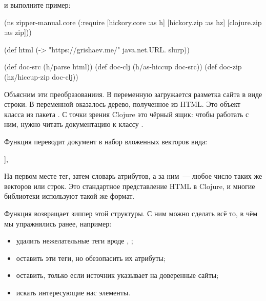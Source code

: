\begin{english}
  \begin{clojure}
[hickory "0.7.1"]
  \end{clojure}
\end{english}

\noindent
и выполните пример:

\begin{english}
  \begin{clojure}
(ns zipper-manual.core
  (:require
   [hickory.core :as h]
   [hickory.zip :as hz]
   [clojure.zip :as zip]))

(def html (-> "https://grishaev.me/"
              java.net.URL.
              slurp))

(def doc-src (h/parse html))
(def doc-clj (h/as-hiccup doc-src))
(def doc-zip (hz/hiccup-zip doc-clj))
  \end{clojure}
\end{english}

Объясним эти преобразованиия. В переменную  загружается разметка сайта в
виде строки. В переменной  оказалось дерево, полученное из HTML. Это
объект класса  из пакета . С точки зрения Clojure это
чёрный ящик: чтобы работать с ним, нужно читать документацию к классу
.

Функция  переводит документ в набор вложенных векторов вида:

\begin{english}
  \begin{clojure}
[:tag {:attr "value"} & [...]],
  \end{clojure}
\end{english}

На первом месте тег, затем словарь атрибутов, а за ним~--- любое число таких же
векторов или строк. Это стандартное представление HTML в Clojure, и многие
библиотеки используют такой же формат.

Функция  возвращает зиппер этой структуры. С ним можно сделать всё
то, в чём мы упражнялись ранее, например:

\begin{itemize}

\item
  удалить нежелательные теги вроде , ;

\item
  оставить эти теги, но обезопасить их атрибуты;

\item
  оставить, только если источник указывает на доверенные сайты;

\item
  искать интересующие нас элементы.

\end{itemize}

